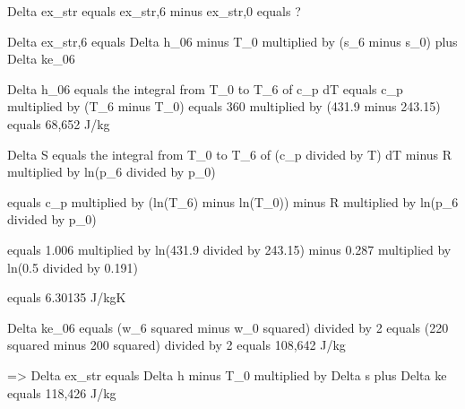 Delta ex_str equals ex_str,6 minus ex_str,0 equals ?  

Delta ex_str,6 equals Delta h_06 minus T_0 multiplied by (s_6 minus s_0) plus Delta ke_06  

Delta h_06 equals the integral from T_0 to T_6 of c_p dT equals c_p multiplied by (T_6 minus T_0) equals 360 multiplied by (431.9 minus 243.15) equals 68,652 J/kg  

Delta S equals the integral from T_0 to T_6 of (c_p divided by T) dT minus R multiplied by ln(p_6 divided by p_0)  

equals c_p multiplied by (ln(T_6) minus ln(T_0)) minus R multiplied by ln(p_6 divided by p_0)  

equals 1.006 multiplied by ln(431.9 divided by 243.15) minus 0.287 multiplied by ln(0.5 divided by 0.191)  

equals 6.30135 J/kgK  

Delta ke_06 equals (w_6 squared minus w_0 squared) divided by 2 equals (220 squared minus 200 squared) divided by 2 equals 108,642 J/kg  

=> Delta ex_str equals Delta h minus T_0 multiplied by Delta s plus Delta ke equals 118,426 J/kg